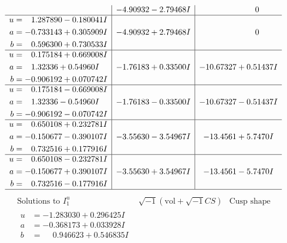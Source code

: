 \documentclass[1p]{elsarticle_modified}
\theoremstyle{definition}
\newcommand{\I}{\sqrt{-1}}
\begin{document}
$$\begin{array}{c|c|c}
 & -4.90932 - 2.79468 I & \phantom{-0.000000 } 0 \\ \hline\begin{aligned}
u &= \phantom{-}1.287890 - 0.180041 I \\
a &= -0.733143 + 0.305909 I \\
b &= \phantom{-}0.596300 + 0.730533 I\end{aligned}
 & -4.90932 + 2.79468 I & \phantom{-0.000000 } 0 \\ \hline\begin{aligned}
u &= \phantom{-}0.175184 + 0.669008 I \\
a &= \phantom{-}1.32336 + 0.54960 I \\
b &= -0.906192 + 0.070742 I\end{aligned}
 & -1.76183 + 0.33500 I & -10.67327 + 0.51437 I \\ \hline\begin{aligned}
u &= \phantom{-}0.175184 - 0.669008 I \\
a &= \phantom{-}1.32336 - 0.54960 I \\
b &= -0.906192 - 0.070742 I\end{aligned}
 & -1.76183 - 0.33500 I & -10.67327 - 0.51437 I \\ \hline\begin{aligned}
u &= \phantom{-}0.650108 + 0.232781 I \\
a &= -0.150677 - 0.390107 I \\
b &= \phantom{-}0.732516 + 0.177916 I\end{aligned}
 & -3.55630 - 3.54967 I & -13.4561 + 5.7470 I \\ \hline\begin{aligned}
u &= \phantom{-}0.650108 - 0.232781 I \\
a &= -0.150677 + 0.390107 I \\
b &= \phantom{-}0.732516 - 0.177916 I\end{aligned}
 & -3.55630 + 3.54967 I & -13.4561 - 5.7470 I\\
 \hline 
 \end{array}$$\newpage$$\begin{array}{c|c|c}  
\text{Solutions to }I^u_{1}& \I (\text{vol} + \sqrt{-1}CS) & \text{Cusp shape}\\
 \hline 
\begin{aligned}
u &= -1.283030 + 0.296425 I \\
a &= -0.368173 + 0.033928 I \\
b &= \phantom{-}0.946623 + 0.546835 I\end{aligned}

\end{array}$$
\end{document}
